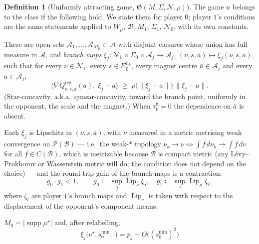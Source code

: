 \documentclass[11pt]{article}
\theoremstyle{definition}
\newtheorem{definition}{Definition}
\newcommand{\cA}{\mathcal{A}}
\newcommand{\cB}{\mathcal{B}}
\newcommand{\cP}{\mathcal{P}}
\newcommand{\cN}{\mathcal{N}}
\DeclareMathOperator{\supp}{supp}
\begin{document}
\begin{definition}[Uniformly attracting game, $\mathfrak{G}(M,\Sigma,\cN,\rho)$]
\label{def:class}
The game $u$ belongs to the class if the following hold. We state them for
player $0$; player $1$'s conditions are the same statements applied to $W_\mu$,
$\cB$, $M_1$, $\Sigma_1$, $\cN_0$, with its own constants.

\begin{conditions}
\item[\textbf{(C) Uniform attracting cell structure.}] There are open sets
  $\cA_1,\dots,\cA_{M_0} \subset \cA$ with disjoint closures whose union has full
  measure in $\cA$, and \emph{branch maps}
  $\xi_j : \cN_1 \times \Sigma_0 \times \cA_j \to \cA_j$,
  $(\nu, s, \bar a) \mapsto \xi_j(\nu,s,\bar a)$, such that for every
  $\nu \in \cN_1$, every $s \in \Sigma_0^{n_0}$, every magnet centre
  $\bar a \in \cA_j$ and every $a \in \cA_j$,
  \begin{equation}\label{eq:star}
    \big\langle \nabla Q^{\mathrm{reg}}_{\nu,s,\bar a}(a),\;
      \xi_j - a \big\rangle \;\ge\; \rho\big(\|\xi_j - a\|\big)\,\|\xi_j - a\| .
  \end{equation}
  (Star-concavity, a.k.a.\ quasar-concavity, toward the branch point, uniformly
  in the opponent, the scale and the magnet.) When $\tau^{\mathrm g}_0 = 0$ the
  dependence on $\bar a$ is absent.
\item[\textbf{(D) Branch regularity and small gain.}] Each $\xi_j$ is Lipschitz
  in $(\nu, s, \bar a)$, with $\nu$ measured in a metric metrising weak
  convergence on $\cP(\cB)$ --- i.e.\ the weak-$*$ topology
  $\nu_k \to \nu \iff \int f \, d\nu_k \to \int f \, d\nu$ for all
  $f \in C(\cB)$, which is metrizable because $\cB$ is compact metric (any
  Lévy--Prokhorov or Wasserstein metric will do; the condition does not depend on
  the choice) --- and the round-trip gain of the branch maps is a contraction:
  \begin{equation}\label{eq:smallgain}
    g_0 \cdot g_1 < 1, \qquad
    g_0 \coloneqq \sup_j \operatorname{Lip}_\nu \xi_j, \quad
    g_1 \coloneqq \sup_l \operatorname{Lip}_\mu \zeta_l ,
  \end{equation}
  where $\zeta_l$ are player $1$'s branch maps and $\operatorname{Lip}_\nu$ is
  taken with respect to the displacement of the opponent's component means.
\item[\textbf{(M) Modal match.}] $M_0 = |\supp \mu^\star|$ and, after
  relabelling,
  \begin{equation}
    \xi_j\big(\nu^\star, s^{\min}_0, \cdot\big) = p_j + O\big((s^{\min}_0)^2\big)

\end{equation}
\end{conditions}
\end{definition}
\end{document}
